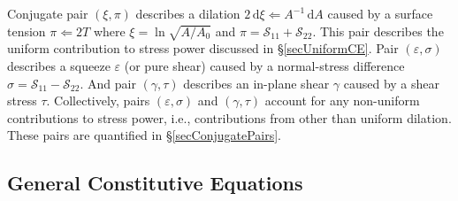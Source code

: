Conjugate pair $( \xi , \pi )$ describes a dilation $2 \, \mathrm{d} \xi \Leftarrow A^{-1} \, \mathrm{d} A$ caused by a surface tension $\pi \Leftarrow 2T$ where $\xi = \ln \sqrt{A / \! A_0}$ and $\pi = \mathcal{S}_{11} + \mathcal{S}_{22}$.  This pair describes the uniform contribution to stress power discussed in \S\ref{secUniformCE}.  Pair $( \varepsilon , \sigma )$ describes a squeeze $\varepsilon$ (or pure shear) caused by a normal-stress difference $\sigma = \mathcal{S}_{11} - \mathcal{S}_{22}$.  And pair $( \gamma , \tau )$ describes an in-plane shear $\gamma$ caused by a shear stress $\tau$. Collectively, pairs $( \varepsilon , \sigma )$ and $( \gamma , \tau )$ account for any non-uniform contributions to stress power, i.e., contributions from other than uniform dilation.  These pairs are quantified in \S\ref{secConjugatePairs}.

\subsection{General Constitutive Equations}

